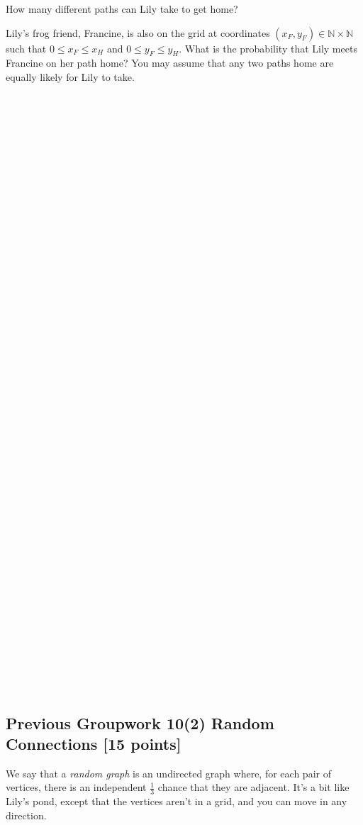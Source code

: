 \documentclass[12pt]{exam}
\begin{document}
\begin{qparts}
    \item How many different paths can Lily take to get home?
    \item Lily's frog friend, Francine, is also on the grid at coordinates $(x_F, y_F) \in \mathbb{N} \times \mathbb{N}$ such that $0 \leq x_F \leq x_H$ and $0 \leq y_F \leq y_H$. What is the probability that Lily meets Francine on her path home? You may assume that any two paths home are equally likely for Lily to take.
\end{qparts}
\begin{solution}
    ~\\~\\~\\~\\~\\~\\~\\~\\~\\~\\~\\~\\~\\~\\~\\~\\~\\~\\~\\~\\~\\~\\~\\~\\~\\~\\~\\~\\
    ~\\~\\~\\~\\~\\~\\~\\~\\~\\~\\~\\~\\~\\~\\~\\
\end{solution}

\subsection*{Previous Groupwork 10(2) Random Connections [15 points]}
We say that a \textit{random graph} is an undirected graph where, for each pair of vertices, there is an independent $\frac{1}{3}$ chance that they are adjacent. It's a bit like Lily's pond, except that the vertices aren't in a grid, and you can move in any direction.
\end{document}
